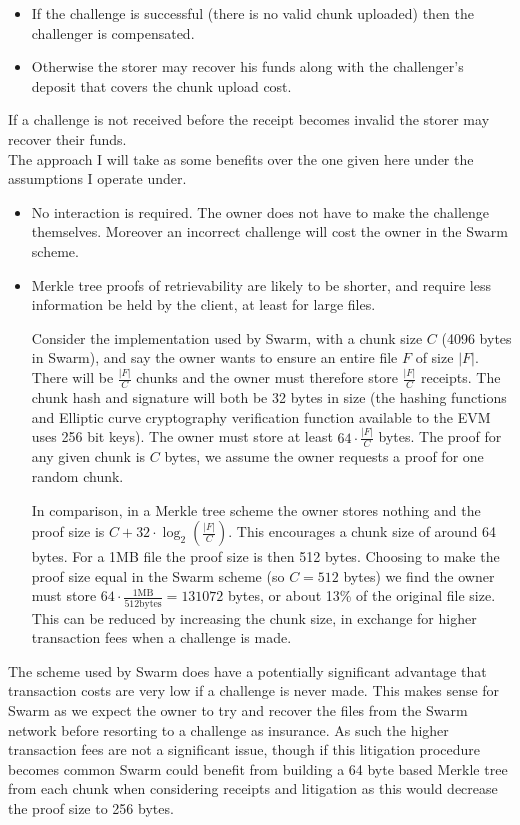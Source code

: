 \documentclass[12pt,a4paper,twoside,openright]{report}
\begin{document}
\begin{itemize}
\item If the challenge is successful (there is no valid chunk uploaded) then the challenger is compensated.
\item Otherwise the storer may recover his funds along with the challenger's deposit that covers the chunk upload cost.
\end{itemize}

If a challenge is not received before the receipt becomes invalid the storer may recover their funds.\\

The approach I will take as some benefits over the one given here under the assumptions I operate under.
\begin{itemize}
\item No interaction is required. The owner does not have to make the challenge themselves. Moreover an incorrect challenge will cost the owner in the Swarm scheme.
\item Merkle tree proofs of retrievability are likely to be shorter, and require less information be held by the client, at least for large files.

Consider the implementation used by Swarm, with a chunk size $C$ (4096 bytes in Swarm), and say the owner wants to ensure an entire file $F$ of size $|F|$.
There will be $\frac{|F|}{C}$ chunks and the owner must therefore store $\frac{|F|}{C}$ receipts.
The chunk hash and signature will both be 32 bytes in size (the hashing functions and Elliptic curve cryptography verification function available to the EVM uses 256 bit keys).
The owner must store at least $64 \cdot \frac{|F|}{C}$ bytes. The proof for any given chunk is $C$ bytes, we assume the owner requests a proof for one random chunk.

In comparison, in a Merkle tree scheme the owner stores nothing and the proof size is $C + 32 \cdot \log_2(\frac{|F|}{C})$.
This encourages a chunk size of around 64 bytes. For a 1MB file the proof size is then 512 bytes.
Choosing to make the proof size equal in the Swarm scheme (so $C = 512$ bytes) we find the owner must store $64 \cdot \frac{1 \text{MB}}{512 \text{bytes}} = 131072$ bytes,
or about 13\% of the original file size. This can be reduced by increasing the chunk size, in exchange for higher transaction fees when a challenge is made.
\end{itemize}

The scheme used by Swarm does have a potentially significant advantage that transaction costs are very low if a challenge is never made.
This makes sense for Swarm as we expect the owner to try and recover the files from the Swarm network before resorting to a challenge as insurance.
As such the higher transaction fees are not a significant issue, though if this litigation procedure becomes common Swarm could benefit from building a 64 byte based Merkle tree
from each chunk when considering receipts and litigation as this would decrease the proof size to 256 bytes.
\end{document}
